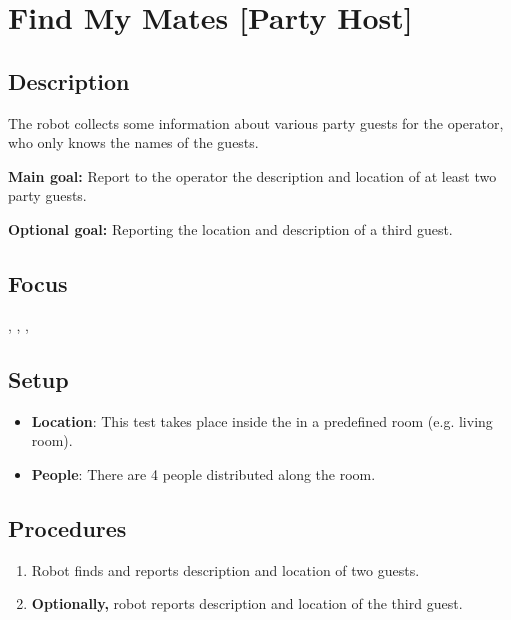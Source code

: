 \section{Find My Mates [Party Host]}
\label{test:find-my-mates}

\subsection*{Description}
    The robot collects some information about various party guests for the operator, who only knows the names of the guests.

\textbf{Main goal:}
    Report to the operator the description and location of at least two party guests.

\textbf{Optional goal:}
    Reporting the location and description of a third guest.

\subsection*{Focus}
\SysI{}, \HRI{}, \PerDet{}, \PerRec

\subsection*{Setup}
\begin{itemize}
	\item \textbf{Location}: This test takes place inside the \Arena{} in a predefined room (e.g. living room).
	\item \textbf{People}: There are 4 people distributed along the room.
\end{itemize}

\subsection*{Procedures}
\begin{enumerate}
	\item Robot finds and reports description and location of two guests.
	\item \textbf{Optionally,} robot reports description and location of the third guest.
\end{enumerate}

